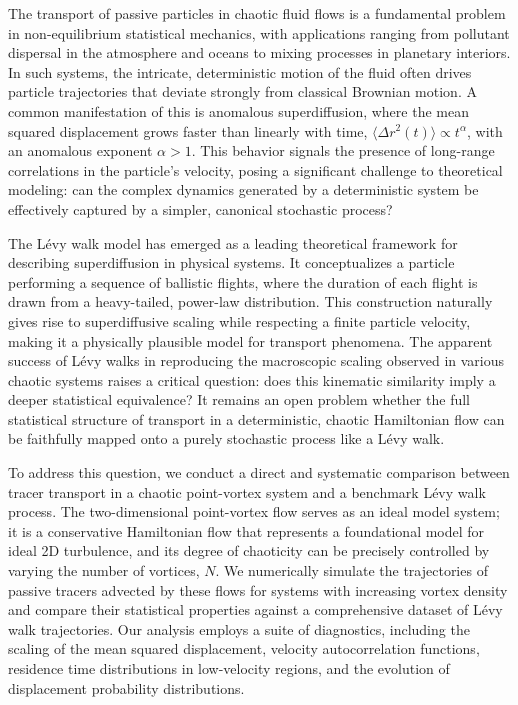 \documentclass[]{article}
\begin{document}
The transport of passive particles in chaotic fluid flows is a fundamental problem in non-equilibrium statistical mechanics, with applications ranging from pollutant dispersal in the atmosphere and oceans to mixing processes in planetary interiors. In such systems, the intricate, deterministic motion of the fluid often drives particle trajectories that deviate strongly from classical Brownian motion. A common manifestation of this is anomalous superdiffusion, where the mean squared displacement grows faster than linearly with time, $\langle \Delta r^2(t) \rangle \propto t^\alpha$, with an anomalous exponent $\alpha > 1$. This behavior signals the presence of long-range correlations in the particle's velocity, posing a significant challenge to theoretical modeling: can the complex dynamics generated by a deterministic system be effectively captured by a simpler, canonical stochastic process?

The Lévy walk model has emerged as a leading theoretical framework for describing superdiffusion in physical systems. It conceptualizes a particle performing a sequence of ballistic flights, where the duration of each flight is drawn from a heavy-tailed, power-law distribution. This construction naturally gives rise to superdiffusive scaling while respecting a finite particle velocity, making it a physically plausible model for transport phenomena. The apparent success of Lévy walks in reproducing the macroscopic scaling observed in various chaotic systems raises a critical question: does this kinematic similarity imply a deeper statistical equivalence? It remains an open problem whether the full statistical structure of transport in a deterministic, chaotic Hamiltonian flow can be faithfully mapped onto a purely stochastic process like a Lévy walk.

To address this question, we conduct a direct and systematic comparison between tracer transport in a chaotic point-vortex system and a benchmark Lévy walk process. The two-dimensional point-vortex flow serves as an ideal model system; it is a conservative Hamiltonian flow that represents a foundational model for ideal 2D turbulence, and its degree of chaoticity can be precisely controlled by varying the number of vortices, $N$. We numerically simulate the trajectories of passive tracers advected by these flows for systems with increasing vortex density and compare their statistical properties against a comprehensive dataset of Lévy walk trajectories. Our analysis employs a suite of diagnostics, including the scaling of the mean squared displacement, velocity autocorrelation functions, residence time distributions in low-velocity regions, and the evolution of displacement probability distributions.
\end{document}

